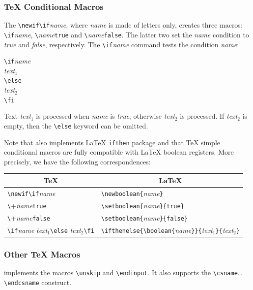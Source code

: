\subsubsection{\TeX{} Conditional Macros}\label{texcond}
The \verb+\newif\if+\textit{name}, where \textit{name} is made of letters
only, creates three macros:
\verb+\if+\textit{name}, \verb+\+\textit{name}\verb+true+ and
\verb+\+\textit{name}\verb+false+.
The latter two set the \textit{name} condition to \textit{true} and
\textit{false}, respectively.
The \verb+\if+\textit{name} command tests the condition \textit{name}:
\begin{flushleft}
\verb+\if+\textit{name}\\
\textit{text$_1$}\\
\verb+\else+\\
\textit{text$_2$}\\
\verb+\fi+\\
\end{flushleft}
Text \textit{text$_1$} is processed when \textit{name} is
\textit{true}, otherwise \textit{text$_2$} is processed.
If \textit{text$_2$}  is empty, then the \verb+\else+ keyword can be
omitted.

Note that \hevea{} also implements \LaTeX{} \texttt{ifthen} package
and that \TeX{} simple conditional macros are fully compatible with
\LaTeX{} boolean registers. More precisely,
we have the following correspondences:
\begin{center}
\begin{tabular}{p{.3\linewidth}@{\quad}p{.4\linewidth}}
\multicolumn{1}{c}{\TeX} & \multicolumn{1}{c}{\LaTeX}\\[.5em]
\hline
\verb+\newif\if+\textit{name} & \verb+\newboolean{+\textit{name}\verb+}+\\[.5em]
\verb+\+\textit{name}\verb+true+ &
\verb+\setboolean{+\textit{name}\verb+}{true}+\\[.5em]
\verb+\+\textit{name}\verb+false+ &
\verb+\setboolean{+\textit{name}\verb+}{false}+\\[.5em]
\verb+\if+\textit{name} \textit{text$_1$}\verb+\else+
\textit{text$_2$}\verb+\fi+ &
\verb+\ifthenelse{\boolean{+\textit{name}\verb+}}{+\textit{text$_1$}\verb+}{+\textit{text$_2$}\verb+}+\\[.5em]
\end{tabular}
\end{center}

\subsubsection{Other \TeX{} Macros}
\hevea{} implements the macros \verb+\unskip+ and \verb+\endinput+.
It also supports the \verb+\csname+\ldots{} \verb+\endcsname+
construct.


